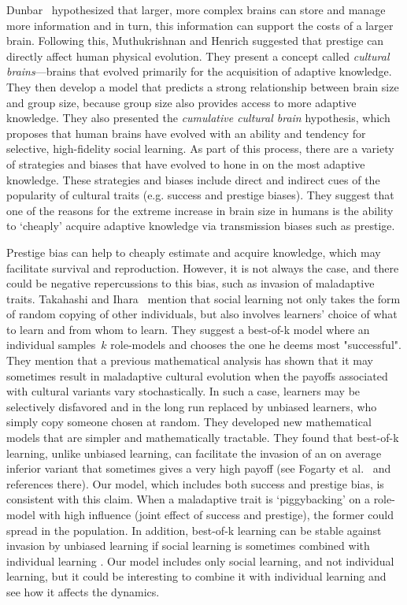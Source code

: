 \documentclass[12pt]{extarticle}
\begin{document}
Dunbar~\citep{social_brains} hypothesized that larger, more complex brains can store and manage more information and in turn, this information can support the costs of a larger brain.
Following this, Muthukrishnan and Henrich \citep{collective_brains} suggested that prestige can directly affect human physical evolution. They present a concept called \emph{cultural brains}---brains that evolved primarily for the acquisition of adaptive knowledge.
They then develop a model that predicts a strong relationship between brain size and group size, because group size also provides access to more adaptive knowledge. 
They also presented the \emph{cumulative cultural brain} hypothesis, which proposes that human brains have evolved with an ability and tendency for selective, high-fidelity social learning. As part of this process, there are a variety of strategies and biases that have evolved to hone in on the most adaptive knowledge. These strategies and biases include direct and indirect cues of the popularity of cultural traits (e.g. success and prestige biases).
They suggest that one of the reasons for the extreme increase in brain size in humans is the ability to `cheaply' acquire adaptive knowledge via transmission biases such as prestige.

Prestige bias can help to cheaply estimate and acquire knowledge, which may facilitate survival and reproduction. However, it is not always the case, and there could be negative repercussions to this bias, such as invasion of maladaptive traits.
Takahashi and Ihara~\citep{best_of_k} mention that social learning not only takes the form of random copying of other individuals, but also involves learners' choice of what to learn and from whom to learn. They suggest a best-of-k model where an individual samples~$k$ role-models and chooses the one he deems most "successful". They mention that a previous mathematical analysis has shown that it may sometimes result in maladaptive cultural evolution when the payoffs associated with cultural variants vary stochastically. In such a case, learners may be selectively disfavored and in the long run replaced by unbiased learners, who simply copy someone chosen at random. They developed new mathematical models that are simpler and mathematically tractable. They found that best-of-k learning, unlike unbiased learning, can facilitate the invasion of an on average inferior variant that sometimes gives a very high payoff (see Fogarty et al.\ \citep{Fogarty2017} and references there). Our model, which includes both success and prestige bias, is consistent with this claim. When a maladaptive trait is `piggybacking' on a role-model with high influence (joint effect of success and prestige), the former could spread in the population.
In addition, best-of-k learning can be stable against invasion by unbiased learning if social learning is sometimes combined with individual learning \citep{best_of_k}. 
Our model includes only social learning, and not individual learning, but it could be interesting to combine it with individual learning and see how it affects the dynamics.
\end{document}
